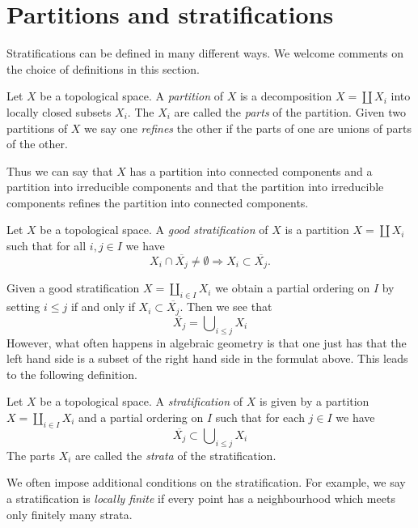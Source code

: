 \section{Partitions and stratifications}
\label{section-stratifications}

\noindent
Stratifications can be defined in many different ways. We welcome
comments on the choice of definitions in this section.

\begin{definition}
\label{definition-paritition}
Let $X$ be a topological space. A {\it partition} of $X$ is a
decomposition $X = \coprod X_i$ into locally closed subsets $X_i$.
The $X_i$ are called the {\it parts} of the partition.
Given two partitions of $X$ we say one {\it refines} the other if
the parts of one are unions of parts of the other.
\end{definition}

\noindent
Thus we can say that $X$ has a partition into connected components
and a partition into irreducible components and that the partition
into irreducible components refines the partition into connected
components.

\begin{definition}
\label{definition-good-stratification}
Let $X$ be a topological space. A {\it good stratification}
of $X$ is a partition $X = \coprod X_i$ such that for all
$i, j \in I$ we have
$$
X_i \cap \overline{X_j} \not = \emptyset
\Rightarrow
X_i \subset \overline{X_j}.
$$
\end{definition}

\noindent
Given a good stratification $X = \coprod_{i \in I} X_i$ we obtain
a partial ordering on $I$ by setting $i \leq j$ if and only if
$X_i \subset \overline{X_j}$. Then we see that
$$
\overline{X_j} = \bigcup\nolimits_{i \leq j} X_i
$$
However, what often happens in algebraic geometry is that one just
has that the left hand side is a subset of the right hand side in
the formulat above. This leads to the following definition.

\begin{definition}
\label{definition-stratification}
Let $X$ be a topological space. A {\it stratification} of $X$ is
given by a partition $X = \coprod_{i \in I} X_i$ and a partial ordering
on $I$ such that for each $j \in I$ we have
$$
\overline{X_j} \subset \bigcup\nolimits_{i \leq j} X_i
$$
The parts $X_i$ are called the {\it strata} of the stratification.
\end{definition}

\noindent
We often impose additional conditions on the stratification.
For example, we say a stratification is {\it locally finite}
if every point has a neighbourhood which meets only finitely
many strata.

